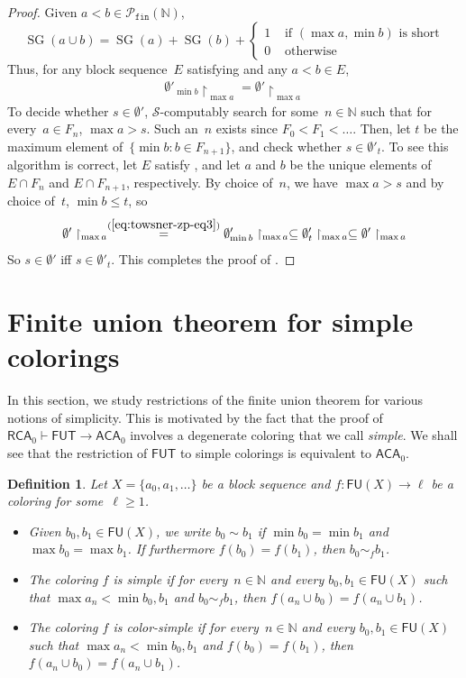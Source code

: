 \documentclass{article}
\def\Sc{\mathcal{S}}
\newcommand{\uh}{\upharpoonright}
\newcommand{\RCA}[0]{\mathsf{RCA}}
\newcommand{\ACA}[0]{\mathsf{ACA}}
\newcommand{\FUT}[0]{\mathsf{FUT}}
\newcommand{\NN}[0]{\mathbb{N}}
\newcommand{\SG}{\operatorname{SG}} %
\newcommand{\Pfin}{\mathcal{P}_{\mathtt{fin}}}
\newcommand{\FU}[0]{\mathsf{FU}} %
\numberwithin{theorem}{section}
\newtheorem{definition}[theorem]{Definition}
\begin{document}
\begin{proof}
\noindent
Given $a < b \in \Pfin(\NN)$, 
$$
\SG(a \cup b) = \SG(a) + \SG(b) + \begin{cases}
    1 & \text{ if $(\max a, \min b)$ is short}\\
    0 & \text{ otherwise}
\end{cases}
$$
Thus, for any block sequence~$E$ satisfying  and any $a < b \in E$,
\begin{align}\label{eq:towsner-zp-eq3}
\emptyset'_{\min b} \uh_{\max a} = \emptyset' \uh_{\max a}
\end{align}
To decide whether $s \in \emptyset'$, $\Sc$-computably search for some~$n \in \NN$ such that for every~$a \in F_n$, $\max a > s$. Such an~$n$ exists since $F_0 < F_1 < \dots$.
Then, let $t$ be the maximum element of~$\{ \min b : b \in F_{n+1} \}$, and check whether $s \in \emptyset'_t$.
To see this algorithm is correct, let $E$ satisfy , and let $a$ and $b$ be the unique elements of $E \cap F_n$ and $E \cap F_{n+1}$, respectively. By choice of~$n$, we have $\max a > s$ and by choice of~$t$, $\min b \leq t$, so
$$
\emptyset' \uh_{\max a} \overset{(\ref{eq:towsner-zp-eq3})}=  \emptyset'_{\min b} \uh_{\max a}  \subseteq  \emptyset'_t \uh_{\max a} \subseteq  \emptyset' \uh_{\max a}
$$
So $s \in \emptyset'$ iff $s \in \emptyset'_t$. This completes the proof of .
\end{proof}

\section{Finite union theorem for simple colorings}

In this section, we study restrictions of the finite union theorem for various notions of simplicity.
This is motivated by the fact that the proof of $\RCA_0 \vdash \FUT \to \ACA_0$ involves a degenerate coloring that we call \emph{simple}. We shall see that the restriction of $\FUT$ to simple colorings is equivalent to $\ACA_0$.

\begin{definition}
Let $X = \{ a_0, a_1, \dots \}$ be a block sequence and $f : \FU(X) \to \ell$ be a coloring for some~$\ell \geq 1$.
\begin{itemize}
    \item Given $b_0, b_1 \in \FU(X)$, we write $b_0 \sim b_1$ if $\min b_0 = \min b_1$ and $\max b_0 = \max b_1$. If furthermore $f(b_0) = f(b_1)$, then $b_0 \sim_f b_1$.
    \item The coloring $f$ is \emph{simple} if for every~$n \in \NN$ and every $b_0, b_1 \in \FU(X)$ such that $\max a_n < \min b_0, b_1$ and $b_0 \sim_f b_1$, then $f(a_n \cup b_0) = f(a_n \cup b_1)$.
    \item The coloring $f$ is \emph{color-simple} if for every~$n \in \NN$ and every $b_0, b_1 \in \FU(X)$ such that $\max a_n < \min b_0, b_1$ and $f(b_0) = f(b_1)$, then $f(a_n \cup b_0) = f(a_n \cup b_1)$.
\end{itemize}
\end{definition}
\end{document}
